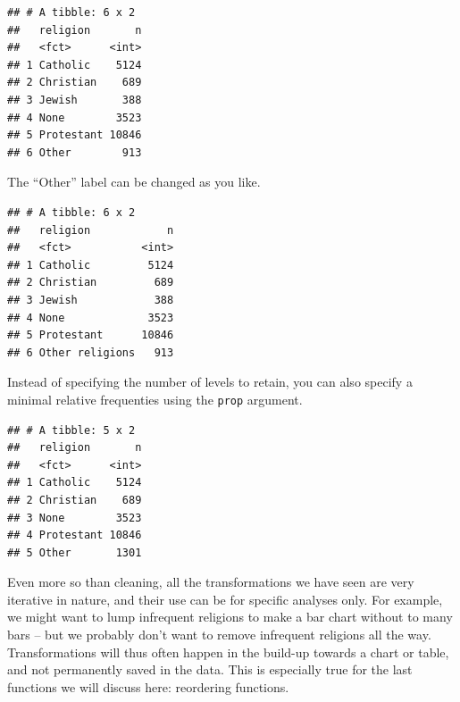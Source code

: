 \documentclass[]{tufte-book}
\newenvironment{Shaded}{}{}
\newcommand{\KeywordTok}[1]{\textcolor[rgb]{0.00,0.44,0.13}{\textbf{#1}}}
\newcommand{\DataTypeTok}[1]{\textcolor[rgb]{0.56,0.13,0.00}{#1}}
\newcommand{\DecValTok}[1]{\textcolor[rgb]{0.25,0.63,0.44}{#1}}
\newcommand{\FloatTok}[1]{\textcolor[rgb]{0.25,0.63,0.44}{#1}}
\newcommand{\StringTok}[1]{\textcolor[rgb]{0.25,0.44,0.63}{#1}}
\newcommand{\OperatorTok}[1]{\textcolor[rgb]{0.40,0.40,0.40}{#1}}
\newcommand{\NormalTok}[1]{#1}
\begin{document}
\begin{verbatim}
## # A tibble: 6 x 2
##   religion       n
##   <fct>      <int>
## 1 Catholic    5124
## 2 Christian    689
## 3 Jewish       388
## 4 None        3523
## 5 Protestant 10846
## 6 Other        913
\end{verbatim}

The ``Other'' label can be changed as you like.

\begin{Shaded}
\end{Shaded}

\begin{verbatim}
## # A tibble: 6 x 2
##   religion            n
##   <fct>           <int>
## 1 Catholic         5124
## 2 Christian         689
## 3 Jewish            388
## 4 None             3523
## 5 Protestant      10846
## 6 Other religions   913
\end{verbatim}

Instead of specifying the number of levels to retain, you can also
specify a minimal relative frequenties using the \texttt{prop} argument.

\begin{Shaded}
\end{Shaded}

\begin{verbatim}
## # A tibble: 5 x 2
##   religion       n
##   <fct>      <int>
## 1 Catholic    5124
## 2 Christian    689
## 3 None        3523
## 4 Protestant 10846
## 5 Other       1301
\end{verbatim}

Even more so than cleaning, all the transformations we have seen are
very iterative in nature, and their use can be for specific analyses
only. For example, we might want to lump infrequent religions to make a
bar chart without to many bars -- but we probably don't want to remove
infrequent religions all the way. Transformations will thus often happen
in the build-up towards a chart or table, and not permanently saved in
the data. This is especially true for the last functions we will discuss
here: reordering functions.
\end{document}
